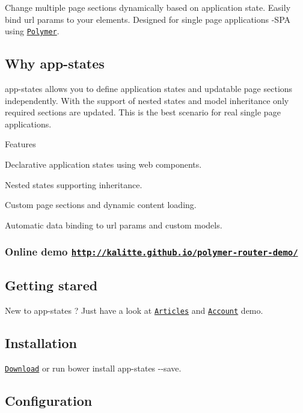 Change multiple page sections dynamically based on application state. Easily bind url params to your elements. Designed for single page applications -\/\+S\+PA using \href{https://www.polymer-project.org/}{\tt Polymer}.

\subsection*{Why app-\/states}

app-\/states allows you to define application states and updatable page sections independently. With the support of nested states and model inheritance only required sections are updated. This is the best scenario for real single page applications.

Features
\begin{DoxyItemize}
\item Declarative application states using web components.
\item Nested states supporting inheritance.
\item Custom page sections and dynamic content loading.
\item Automatic data binding to url params and custom models.
\end{DoxyItemize}

\subsubsection*{Online demo \href{http://kalitte.github.io/polymer-router-demo/}{\tt http\+://kalitte.\+github.\+io/polymer-\/router-\/demo/}}

\subsection*{Getting stared}

New to app-\/states ? Just have a look at \href{http://kalitte.github.io/polymer-router-demo/#/articles}{\tt Articles} and \href{http://kalitte.github.io/polymer-router-demo/#/account}{\tt Account} demo.

\subsection*{Installation}

\href{https://github.com/Kalitte/app-states}{\tt Download} or run {\ttfamily bower install app-\/states -\/-\/save}.

\subsection*{Configuration}

